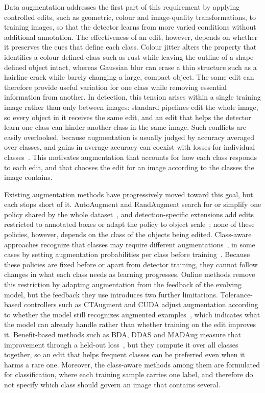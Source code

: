 \documentclass[conference]{IEEEtran}
\begin{document}
Data augmentation addresses the first part of this requirement by applying controlled edits, such as geometric, colour and image-quality transformations, to training images, so that the detector learns from more varied conditions without additional annotation. The effectiveness of an edit, however, depends on whether it preserves the cues that define each class. Colour jitter alters the property that identifies a colour-defined class such as rust while leaving the outline of a shape-defined object intact, whereas Gaussian blur can erase a thin structure such as a hairline crack while barely changing a large, compact object. The same edit can therefore provide useful variation for one class while removing essential information from another. In detection, this tension arises within a single training image rather than only between images: standard pipelines edit the whole image, so every object in it receives the same edit, and an edit that helps the detector learn one class can hinder another class in the same image. Such conflicts are easily overlooked, because augmentation is usually judged by accuracy averaged over classes, and gains in average accuracy can coexist with losses for individual classes~\cite{kirichenko2023}. This motivates augmentation that accounts for how each class responds to each edit, and that chooses the edit for an image according to the classes the image contains.

Existing augmentation methods have progressively moved toward this goal, but each stops short of it. AutoAugment and RandAugment search for or simplify one policy shared by the whole dataset~\cite{cubuk2019auto,cubuk2020rand}, and detection-specific extensions add edits restricted to annotated boxes or adapt the policy to object scale~\cite{zoph2020det,chen2021scale}; none of these policies, however, depends on the class of the objects being edited. Class-aware approaches recognize that classes may require different augmentations~\cite{tsuchiya2019,yoo2023,cheung2022adaaug}, in some cases by setting augmentation probabilities per class before training~\cite{rdd_detectron2}. Because these policies are fixed before or apart from detector training, they cannot follow changes in what each class needs as learning progresses. Online methods remove this restriction by adapting augmentation from the feedback of the evolving model, but the feedback they use introduces two further limitations. Tolerance-based controllers such as CTAugment and CUDA adjust augmentation according to whether the model still recognizes augmented examples~\cite{berthelot2020,ahn2023cuda}, which indicates what the model can already handle rather than whether training on the edit improves it. Benefit-based methods such as BDA, DDAS and MADAug measure that improvement through a held-out loss~\cite{lu2023bda,liu2021ddas,hou2023madaug}, but they compute it over all classes together, so an edit that helps frequent classes can be preferred even when it harms a rare one. Moreover, the class-aware methods among them are formulated for classification, where each training sample carries one label, and therefore do not specify which class should govern an image that contains several.
\end{document}
